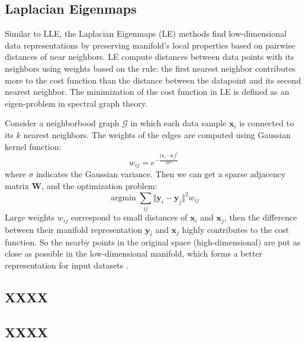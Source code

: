 \documentclass[journal]{IEEEtran}
\DeclareMathOperator*{\argmin}{argmin}
\begin{document}
%
%
\subsection{Laplacian Eigenmaps}
Similar to LLE, the Laplacian Eigenmaps (LE) methods find low-dimensional data representations by preserving manifold's local properties based on pairwise distances of near neighbors.
LE compute distances between data points with its neighbors using weights based on the rule: the first nearest neighbor contributes more to the cost function than the distance between the datapoint and its second nearest neighbor.
The minimization of the cost function in LE is defined as an eigen-problem in spectral graph theory.
 
Consider a neighborbood graph $\mathcal{G}$ in which each data sample $\bm{x}_i$ is connected to its $k$ nearest neighbors.
The weights of the edges are computed using Gaussian kernel function:
\begin{equation}
w_{ij} = e^{-\frac{\Vert \bm{x}_i - \bm{x}_j \Vert^2}{2\sigma^2}}
\end{equation}
where $\sigma$ indicates the Gaussian variance.
Then we can get a sparse adjacency matrix $\bm{W}$, and the optimization problem:
\begin{equation}
\argmin \sum_{ij} \Vert\bm{y}_i - \bm{y}_j \Vert^2 w_{ij}
\end{equation}
Large weights $w_{ij}$ correspond to small distances of $\bm{x}_i$ and $\bm{x}_j$, then the difference between their manifold representation $\bm{y}_i$ and $\bm{x}_j$ highly contributes to the cost function.
So the nearby points in the original space (high-dimensional) are put as close as possible in the low-dimensional manifold, which forms a better representation for input datasets \cite{belkin2003laplacian}.




%
%
\subsection{XXXX}
\lipsum[1-2]

%
%
\subsection{XXXX}
\lipsum[1-2]
\end{document}
